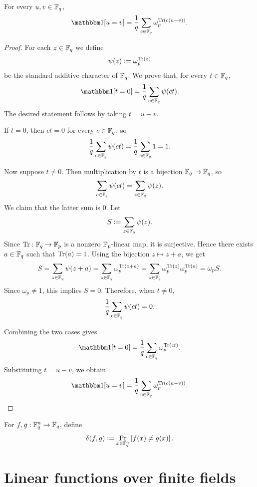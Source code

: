 \begin{lemma}
\label{lem:character-sum-indicator}
\leanok
For every $u,v\in{\mathbb F}_q$,
\[
    \ind[u=v]
    = \frac{1}{q}\sum_{c\in\bbF_q}\omega_p^{\Tr(c(u-v))}.
\]
\end{lemma}
\begin{proof}\leanok
For each $z \in {\mathbb F}_q$ we define
\[
    \psi(z) \mathrel{\mathop:}= \omega_p^{{\rm Tr}(z)}
\]
be the standard additive character of \({\mathbb F}_q\). We prove that, for every
\(t\in {\mathbb F}_q\),
\[
    \ind[t=0]
    =
    \frac{1}{q}\sum_{c\in\bbF_q}\psi(ct).
\]
The desired statement follows by taking \(t=u-v\).

If \(t=0\), then \(ct=0\) for every \(c\in{\mathbb F}_q\), so
\[
    \frac{1}{q}\sum_{c\in{\mathbb F}_q}\psi(ct)
    =
    \frac{1}{q}\sum_{c\in{\mathbb F}_q}1
    =
    1.
\]

Now suppose \(t\neq 0\). Then multiplication by \(t\) is a bijection
\({\mathbb F}_q\to{\mathbb F}_q\), so
\[
    \sum_{c\in{\mathbb F}_q}\psi(ct)
    =
    \sum_{z\in{\mathbb F}_q}\psi(z).
\]
We claim that the latter sum is \(0\). Let
\[
    S \mathrel{\mathop:}= \sum_{z\in{\mathbb F}_q}\psi(z).
\]
Since \({\rm Tr}:{\mathbb F}_q\to{\mathbb F}_p\) is a nonzero \({\mathbb F}_p\)-linear map, it is
surjective. Hence there exists \(a\in{\mathbb F}_q\) such that \({\rm Tr}(a)=1\).
Using the bijection \(z\mapsto z+a\), we get
\[
    S
    =
    \sum_{z\in{\mathbb F}_q}\psi(z+a)
    =
    \sum_{z\in{\mathbb F}_q}\omega_p^{{\rm Tr}(z+a)}
    =
    \sum_{z\in{\mathbb F}_q}\omega_p^{{\rm Tr}(z)}\omega_p^{{\rm Tr}(a)}
    =
    \omega_p S.
\]
Since \(\omega_p\neq 1\), this implies \(S=0\). Therefore, when
\(t\neq 0\),
\[
    \frac{1}{q}\sum_{c\in{\mathbb F}_q}\psi(ct)=0.
\]

Combining the two cases gives
\[
    \ind[t=0]
    =
    \frac{1}{q}\sum_{c\in\bbF_q}\omega_p^{\Tr(ct)}.
\]
Substituting \(t=u-v\), we obtain
\[
    \ind[u=v]
    =
    \frac{1}{q}\sum_{c\in\bbF_q}\omega_p^{\Tr(c(u-v))}.
\]
\end{proof}

\begin{definition}
\label{def:relative-hamming-distance}
\leanok
For $f,g:{\mathbb F}_q^n\to{\mathbb F}_q$, define
\[
    \delta(f,g)
    \mathrel{\mathop:}= \Pr_{x\in{\mathbb F}_q^n}\left[f(x)\ne g(x)\right].
\]
\end{definition}

\section{Linear functions over finite fields}

